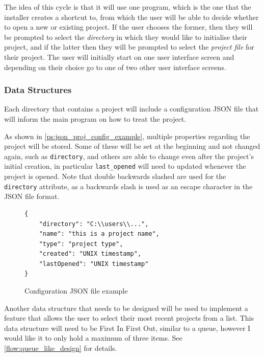 \documentclass[11pt]{article}
\begin{document}
            The idea of this cycle is that it will use one program, which is the one that the installer creates a shortcut to, from which the user will be able to decide whether to open a new or existing project. If the user chooses the former, then they will be prompted to select the \textit{directory} in which they would like to initialise their project, and if the latter then they will be prompted to select the \textit{project file} for their project. 
            The user will initially start on one user interface screen and depending on their choice go to one of two other user interface screens.

            \subsubsection{Data Structures}

                Each directory that contains a project will include a configuration JSON file that will inform the main program on how to treat the project.
                
                As shown in \autoref{ps:json_proj_config_example}, multiple properties regarding the project will be stored. Some of these will be set at the beginning and not changed again, such as \verb|directory|, and others are able to change even after the project's initial creation, in particular \verb|last_opened| will need to updated whenever the project is opened. Note that double backwards slashed are used for the \verb|directory| attribute, as a backwards slash is used as an escape character in the JSON file format.

                \begin{figure}[!ht]
                    \begin{verbatim}
{
    "directory": "C:\\users\\...",
    "name": "this is a project name",
    "type": "project type",
    "created": "UNIX timestamp",
    "lastOpened": "UNIX timestamp"
}
                    \end{verbatim}
                    \caption{Configuration JSON file example}
                    \label{ps:json_proj_config_example}
                \end{figure}
                
                Another data structure that needs to be designed will be used to implement a feature that allows the user to select their most recent projects from a list. 
                This data structure will need to be First In First Out, similar to a queue, however I would like it to only hold a maximum of three items. 
                See \autoref{flow:queue_like_design} for details.
\end{document}

